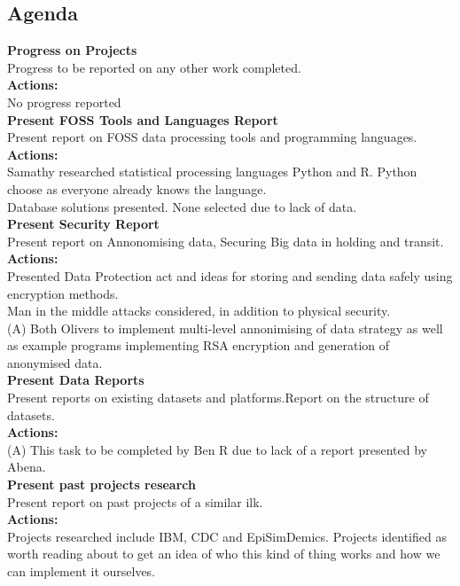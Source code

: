 \documentclass[a4wide,10pt]{extarticle}
\begin{document}
{\subsection*{Agenda}
{\large \textbf{Progress on Projects\\}}
Progress to be reported on any other work completed.\\
\textbf{Actions:\\}
No progress reported\\
{\large \textbf{Present FOSS Tools and Languages Report\\}}
Present report on FOSS data processing tools and programming languages.\\
\textbf{Actions:\\}
Samathy researched statistical processing languages Python and R. Python choose as everyone already knows the language.\\
Database solutions presented. None selected due to lack of data.\\
{\large \textbf{Present Security Report\\}}
Present report on Annonomising data, Securing Big data in holding and transit.\\
\textbf{Actions:\\}
Presented Data Protection act and ideas for storing and sending data safely using encryption methods.\\
Man in the middle attacks considered, in addition to physical security.\\
(A) Both Olivers to implement multi-level annonimising of data strategy as well as example programs implementing RSA encryption and generation of anonymised data.\\
{\large \textbf{Present Data Reports\\}}
Present reports on existing datasets and platforms.Report on the structure of datasets.\\
\textbf{Actions:\\}
(A) This task to be completed by Ben R due to lack of a report presented by Abena.\\
{\large \textbf{Present past projects research\\}}
Present report on past projects of a similar ilk.\\
\textbf{Actions:\\}
Projects researched include IBM, CDC and EpiSimDemics. Projects identified as worth reading about to get an idea of who this kind of thing works and how we can implement it ourselves.\\
}
\end{document}
